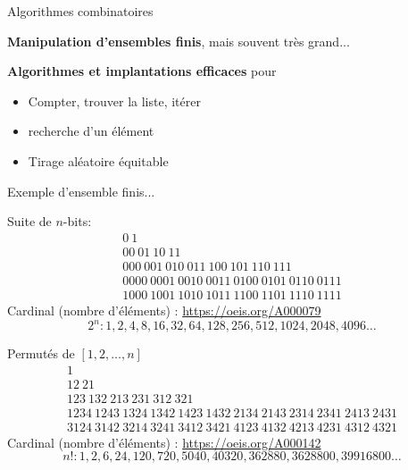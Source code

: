 \documentclass{beamer}
\begin{document}
\begin{frame}{Algorithmes combinatoires}

  \begin{tcolorbox}
    \textbf{Manipulation d'ensembles finis}, mais souvent très grand...
  \end{tcolorbox}
  \bigskip

  \begin{tcolorbox}
    \textbf{Algorithmes et implantations efficaces} pour
    \begin{itemize}
    \item Compter, trouver la liste, itérer
    \medskip
    \item recherche d'un élément
    \medskip
    \item Tirage aléatoire équitable
    \end{itemize}
  \end{tcolorbox}
\end{frame}

\begin{frame}{Exemple d'ensemble finis...}

  Suite de $n$-bits:
  \begin{gather*}
    0\ 1 \\[4mm]
    00\ 01\ 10\ 11 \\[4mm]
    000\ 001\ 010\ 011\ 100\ 101\ 110\ 111 \\[4mm]
    0000\ 0001\ 0010\ 0011\ 0100\ 0101\ 0110\ 0111 \\
    1000\ 1001\ 1010\ 1011\ 1100\ 1101\ 1110\ 1111
  \end{gather*}
  Cardinal (nombre d'éléments) : \url{https://oeis.org/A000079}
  \[2^n : 1, 2, 4, 8, 16, 32, 64, 128, 256, 512, 1024, 2048, 4096 \dots\]
\end{frame}


\begin{frame}{Permutés de $[1,2,\dots,n]$}
  \begin{gather*}
    1 \\[4mm]
    12\ 21 \\[4mm]
    123\ 132\ 213\ 231\ 312\ 321 \\[4mm]
    1234\ 1243\ 1324\ 1342\ 1423\ 1432\ 2134\ 2143\ 2314\ 2341\ 2413\ 2431\\
    3124\ 3142\ 3214\ 3241\ 3412\ 3421\ 4123\ 4132\ 4213\ 4231\ 4312\ 4321
  \end{gather*}
  Cardinal (nombre d'éléments) : \url{https://oeis.org/A000142}
  \[n! : 1, 2, 6, 24, 120, 720, 5040, 40320, 362880, 3628800, 39916800 \dots\]
\end{frame}
\end{document}
